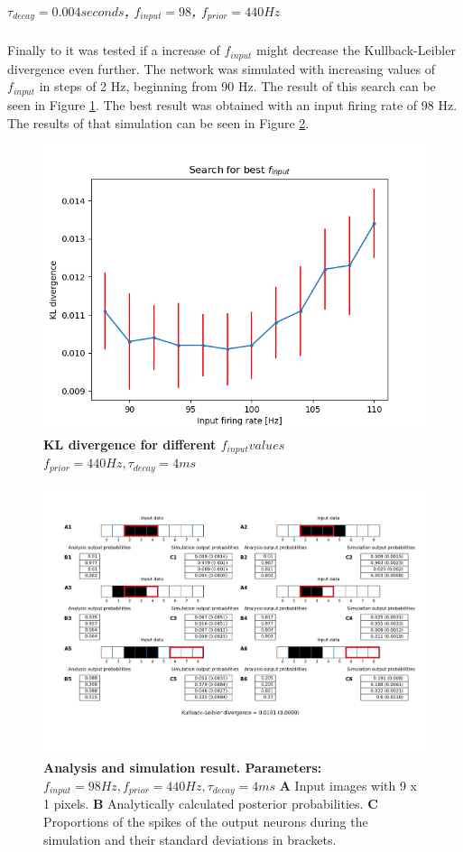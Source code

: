 \subparagraph{$\tau_{decay} = 0.004 seconds$, $f_{input} = 98$, $f_{prior} = 440 Hz$}
Finally to it was tested if a increase of $f_{input}$ might decrease the Kullback-Leibler divergence even further. The network was simulated with increasing values of $f_{input}$ in steps of 2 Hz, beginning from 90 Hz. The result of this search can be seen in Figure \ref{fig:1D_KLD_fPrior440_tau4}. The best result was obtained with an input firing rate of 98 Hz. The results of that simulation can be seen in Figure \ref{fig:1D_98_440_4}.

\begin{figure}
  \includegraphics[width=\linewidth]{figures/1D/KLDvsfInput_fPrior440tau4.png}
  \caption{\textbf{KL divergence for different $f_{input} values$} $f_{prior} = 440 Hz, \tau_{decay} = 4 ms$}
  \label{fig:1D_KLD_fPrior440_tau4}
\end{figure}

\begin{figure}
  \includegraphics[width=\linewidth]{figures/1D/1D_98_440_4.png}
  \caption{\textbf{Analysis and simulation result. Parameters: } $f_{input} = 98 Hz, f_{prior} = 440 Hz, \tau_{decay} = 4 ms$ \textbf{A} Input images with 9 x 1 pixels. \textbf{B} Analytically calculated posterior probabilities. \textbf{C} Proportions of the spikes of the output neurons during the simulation and their standard deviations in brackets.}
  \label{fig:1D_98_440_4}
\end{figure}

